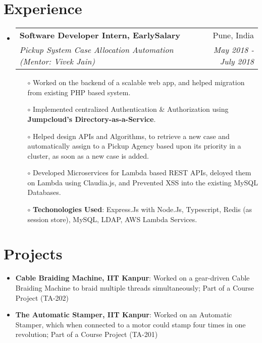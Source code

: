 \documentclass[letterpaper,10pt]{article}
\makeatletter
\newcommand{\resumeItem}[2]{
\item\small{
		\textbf{#1}{: #2 \vspace{-2pt}}
	}
}
\newcommand{\resumeSubheading}[4]{
	\vspace{-1pt}\item
	\begin{tabular*}{0.97\textwidth}{l@{\extracolsep{\fill}}r}
		\textbf{#1} & #2 \\
		\textit{\small#3} & \textit{\small #4} \\
	\end{tabular*}\vspace{-7pt}
}
\newcommand{\resumeSubItem}[2]{\resumeItem{#1}{#2}\vspace{-4pt}}
\newcommand{\resumeSubHeadingListStart}{\begin{itemize}[leftmargin=*]}
\newcommand{\resumeSubHeadingListEnd}{\end{itemize}}
\makeatother
\begin{document}
\section{Experience}
\resumeSubHeadingListStart

\resumeSubheading
{Software Developer Intern, EarlySalary}{Pune, India}
{Pickup System Case Allocation Automation (Mentor: Vivek Jain)}{May 2018 - July 2018}
\vspace{4pt}
\begin{itemize}
	\itemsep1pt
		\item[$\circ$] Worked on the backend of a scalable web app, and helped migration from existing PHP based system.
		\item[$\circ$] Implemented centralized Authentication \& Authorization using \textbf{Jumpcloud’s Directory-as-a-Service}.
		\item[$\circ$] Helped design APIs and Algorithms, to retrieve a new case and automatically assign to a Pickup Agency based upon its priority in a cluster, as soon as a new case is added.
		\item[$\circ$] Developed Microservices for Lambda based REST APIs, deloyed them on Lambda using Claudia.js, and Prevented XSS into the existing MySQL Databases.
		\item[$\circ$] \textbf{Techonologies Used}: Express.Js with Node.Js, Typescript, Redis (as session store), MySQL,
			LDAP, AWS Lambda Services.\vspace*{-8pt}
	\end{itemize}
\resumeSubHeadingListEnd


\section{Projects}
\resumeSubHeadingListStart
\resumeSubItem{Cable Braiding Machine, IIT Kanpur}
{Worked on a gear-driven Cable Braiding Machine to braid multiple threads simultaneously; Part of a Course Project (TA-202)}
\resumeSubItem{The Automatic Stamper, IIT Kanpur}
{Worked on an Automatic Stamper, which when connected to a motor could stamp four times in one revolution; Part of a Course Project (TA-201)}
\resumeSubHeadingListEnd

\end{document}
